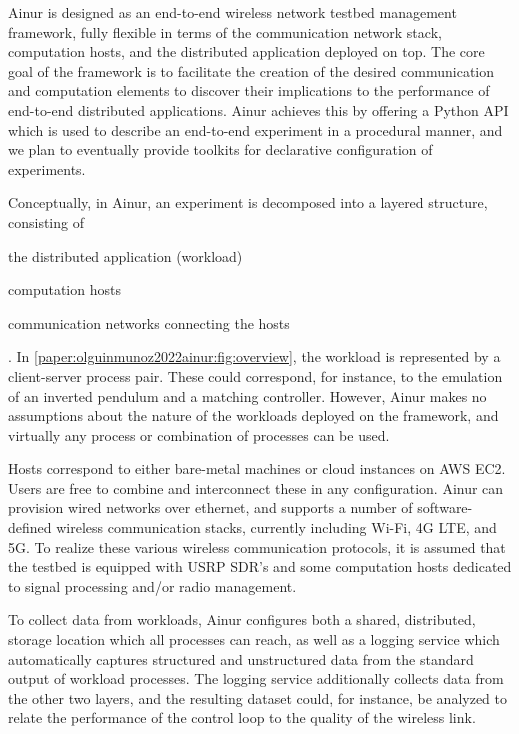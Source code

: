 Ainur is designed as an end-to-end wireless network testbed management framework, fully flexible in terms of the communication network stack, computation hosts, and the distributed application deployed on top.
The core goal of the framework is to facilitate the creation of the desired communication and computation elements to discover their implications to the performance of end-to-end distributed applications.
Ainur achieves this by offering a Python \gls{API} which is used to describe an end-to-end experiment in a procedural manner, and we plan to eventually provide toolkits for declarative configuration of experiments.

Conceptually, in Ainur, an experiment is decomposed into a layered structure, consisting of
\begin{inlineenum}
    \item the distributed application (workload)
    \item computation hosts
    \item communication networks connecting the hosts
\end{inlineenum}.
In \cref{paper:olguinmunoz2022ainur:fig:overview}, the workload is represented by a client-server process pair.
These could correspond, for instance, to the emulation of an inverted pendulum and a matching controller.
However, Ainur makes no assumptions about the nature of the workloads deployed on the framework, and virtually any process or combination of processes can be used.

Hosts correspond to either bare-metal machines or cloud instances on \gls{AWS} \gls{EC2}.
Users are free to combine and interconnect these in any configuration.
Ainur can provision wired networks over ethernet, and supports a number of software-defined wireless communication stacks, currently including Wi-Fi, 4G \gls{LTE}, and 5G.
To realize these various wireless communication protocols, it is assumed that the testbed is equipped with \gls{USRP} \gls{SDR}'s and some computation hosts dedicated to signal processing and/or radio management.

To collect data from workloads, Ainur configures both a shared, distributed, storage location which all processes can reach, as well as a logging service which automatically captures structured and unstructured data from the standard output of workload processes.
The logging service additionally collects data from the other two layers, and the resulting dataset could, for instance, be analyzed to relate the performance of the control loop to the quality of the wireless link. 

